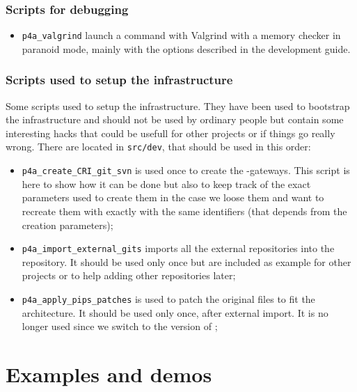 \documentclass[a4paper]{article}
\begin{document}
\subsubsection{Scripts for debugging}
\label{sec:scripts-debugging}

\begin{itemize}
\item \verb|p4a_valgrind| launch a command with Valgrind with a memory
  checker in paranoid mode, mainly with the options described in the
  \Apips development guide.
\end{itemize}


\subsubsection{Scripts used to setup the infrastructure}
\label{sec:scripts-used-setup}


Some scripts used to setup the infrastructure. They have been used to
bootstrap the \Apfa infrastructure and should not be used by ordinary
people but contain some interesting hacks that could be usefull for other
projects or if things go really wrong. There are located in
\texttt{src/dev}, that should be used in this order:
\begin{itemize}
\item \verb/p4a_create_CRI_git_svn/ is used once to create the \Apips
  \Asvn-\Agit gateways. This script is here to show how it can be done but
  also to keep track of the exact parameters used to create them in the
  case we loose them and want to recreate them with exactly with the same
  identifiers (that depends from the creation parameters);
\item \verb/p4a_import_external_gits/ imports all the external \Agit
  repositories into the \Apfa{} \Agit repository. It should be used only
  once but are included as example for other projects or to help adding
  other repositories later;
\item \verb/p4a_apply_pips_patches/ is used to patch the original \Apips
  files to fit the \Apfa architecture. It should be used only once, after
  external \Agit import. It is no longer used since we switch to the
  \Aautotools version of \Apips;
\end{itemize}


\section{Examples and demos}
\label{sec:examples-demos}
\end{document}
